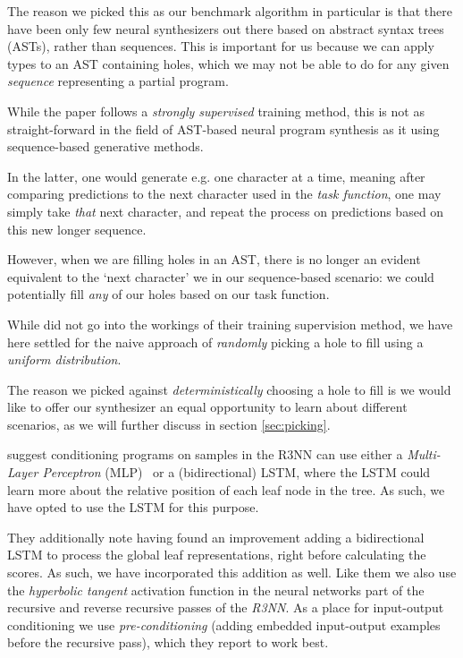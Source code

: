 \documentclass{article}
\begin{document}
The reason we picked this as our benchmark algorithm in particular is that there have been only few neural synthesizers out there based on abstract syntax trees (ASTs), rather than sequences.
This is important for us because we can apply types to an AST containing holes,
which we may not be able to do for any given \emph{sequence} representing a partial program.


While the paper follows a \emph{strongly supervised} training method,
this is not as straight-forward in the field of AST-based neural program synthesis as it using sequence-based generative methods.

In the latter, one would generate e.g. one character at a time,
meaning after comparing predictions to the next character used in the \emph{task function},
one may simply take \emph{that} next character,
and repeat the process on predictions based on this new longer sequence.

However, when we are filling holes in an AST,
there is no longer an evident equivalent to the `next character' we in our sequence-based scenario:
we could potentially fill \emph{any} of our holes based on our task function.

While \citet{nsps} did not go into the workings of their training supervision method,
we have here settled for the naive approach of \emph{randomly} picking a hole to fill using a \emph{uniform distribution}.

The reason we picked against \emph{deterministically} choosing a hole to fill is
we would like to offer our synthesizer an equal opportunity to learn about different scenarios,
as we will further discuss in section \ref{sec:picking}.


\citet{nsps} suggest conditioning programs on samples in the R3NN can use either a
\emph{Multi-Layer Perceptron} (MLP)~\citep{rosenblatt1961principles} or a (bidirectional) LSTM,
where the LSTM could learn more about the relative position of each leaf node in the tree.
As such, we have opted to use the LSTM for this purpose.

They additionally note having found an improvement adding a bidirectional LSTM to process the global leaf representations, right before calculating the scores.
As such, we have incorporated this addition as well.
Like them we also use the \emph{hyperbolic tangent} activation function in the neural networks part of the recursive and reverse recursive passes of the \emph{R3NN}.
As a place for input-output conditioning we use \emph{pre-conditioning}
(adding embedded input-output examples before the recursive pass),
which they report to work best.
\end{document}
